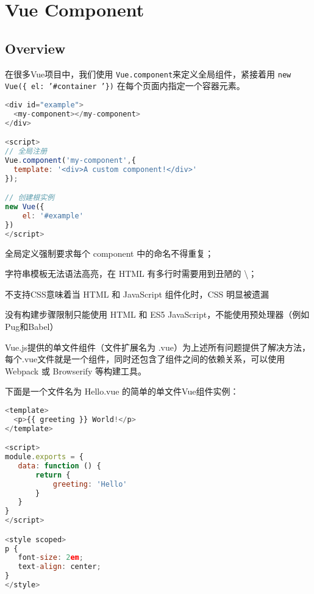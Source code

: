 \part{Vue Component}


\chapter{Overview}


在很多Vue项目中，我们使用 \texttt{Vue.component}来定义全局组件，紧接着用 \texttt{new Vue(\{ el: '\#container '\})} 在每个页面内指定一个容器元素。



\begin{lstlisting}[language=JavaScript]
<div id="example">
  <my-component></my-component>
</div>

<script>
// 全局注册
Vue.component('my-component',{
  template: '<div>A custom component!</div>'
});

// 创建根实例
new Vue({
    el: '#example'
})
</script>
\end{lstlisting}

\begin{compactitem}
\item 全局定义强制要求每个 component 中的命名不得重复；
\item 字符串模板无法语法高亮，在 HTML 有多行时需要用到丑陋的 \textbackslash；
\item 不支持CSS意味着当 HTML 和 JavaScript 组件化时，CSS 明显被遗漏
\item 没有构建步骤限制只能使用 HTML 和 ES5 JavaScript，不能使用预处理器（例如Pug和Babel）
\end{compactitem}

Vue.js提供的单文件组件（文件扩展名为 .vue）为上述所有问题提供了解决方法， 每个.vue文件就是一个组件，同时还包含了组件之间的依赖关系，可以使用 Webpack 或 Browserify 等构建工具。



下面是一个文件名为 Hello.vue 的简单的单文件Vue组件实例：

\begin{lstlisting}[language=JavaScript]
<template>
  <p>{{ greeting }} World!</p>
</template>

<script>
module.exports = {
   data: function () {
       return {
           greeting: 'Hello'
       }
   }
}
</script>

<style scoped>
p {
   font-size: 2em;
   text-align: center;
}
</style>
\end{lstlisting}

